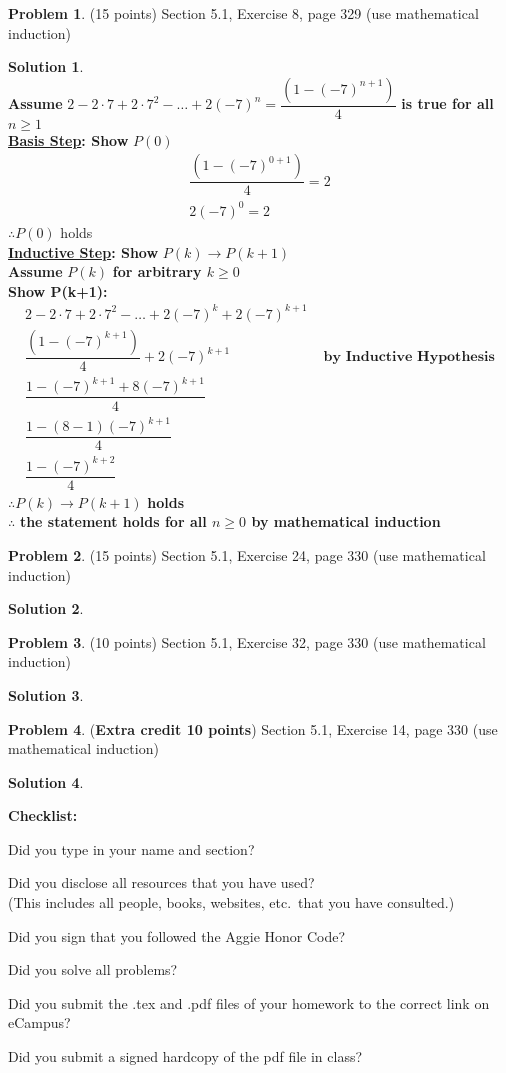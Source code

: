 \documentclass{article}
\theoremstyle{definition}
\newtheorem{problem}{Problem}
\newtheorem*{solution}{Solution}
\newcommand{\checklist}{\noindent\textbf{Checklist:}
\begin{compactitem}[$\Box$] 
\item Did you type in your name and section? 
\item Did you disclose all resources that you have used? \\
(This includes all people, books, websites, etc.\ that you have consulted.)
\item Did you sign that you followed the Aggie Honor Code? 
\item Did you solve all problems? 
\item Did you submit the .tex and .pdf files of your homework to the correct link on eCampus?
\item Did you submit a signed hardcopy of the pdf file in class? 
\end{compactitem}
}
\begin{document}
\begin{problem} (15 points)
Section 5.1, Exercise 8, page 329 (use mathematical induction)
\end{problem}
\begin{solution} \ \\
\textbf{Assume} $2-2\cdot 7+2\cdot 7^2 -\dots +2(-7)^n = \dfrac{(1-(-7)^{n+1})}{4}$ \textbf{is true for all} $n \ge 1 $ \\
\textbf{\underline{Basis Step}: Show } $P(0)$
\begin{align*}
  \dfrac{(1-(-7)^{0+1})}{4} = 2 \\
  2(-7)^0 = 2
\end{align*}
$\therefore P(0)$ holds \\
\textbf{\underline{Inductive Step}: Show } $P(k) \rightarrow P(k+1)$ \\
\textbf{Assume} $P(k)$ \textbf{for arbitrary $k \ge 0 $} \\
\textbf{Show P(k+1):} \\
\begin{align*}
  2-2\cdot 7+2\cdot 7^2 -\dots +2(-7)^k +2(-7)^{k+1} \\
  \dfrac{(1-(-7)^{k+1})}{4} + 2(-7)^{k+1}  &\textbf { by Inductive Hypothesis} \\
  \dfrac{1-(-7)^{k+1}+ 8(-7)^{k+1}}{4} \\
  \dfrac{1 - (8-1)(-7)^{k+1}}{4} \\
  \dfrac{1 - (-7)^{k+2}}{4}
\end{align*}
$\therefore P(k) \rightarrow P(k+1)$ \textbf{holds}\\
$\therefore$ \textbf{the statement holds for all $n \ge 0 $ by mathematical induction}
\end{solution}

\begin{problem} (15 points)
Section 5.1, Exercise 24, page 330 (use mathematical induction)
\end{problem}
\begin{solution} 
\end{solution}

\begin{problem} (10 points)
Section 5.1, Exercise 32, page 330 (use mathematical induction)
\end{problem}
\begin{solution} 
\end{solution}

\begin{problem} (\textbf{Extra credit 10 points})
Section 5.1, Exercise 14, page 330 (use mathematical induction)
\end{problem}
\begin{solution} 
\end{solution}

\goodbreak
\checklist
\end{document}
